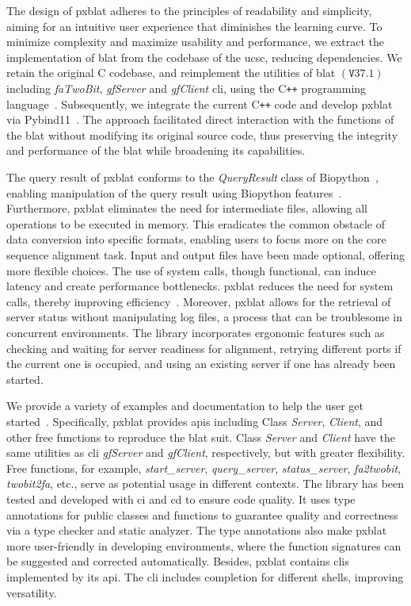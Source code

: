 The design of \gls{pxblat} adheres to the principles of readability and simplicity, aiming for an intuitive user experience that diminishes the learning curve.
To minimize complexity and maximize usability and performance, we extract the implementation of \gls{blat} from the codebase of the \gls{ucsc}, reducing dependencies.
We retain the original C codebase, and reimplement the utilities of \gls{blat} \(\left(\mathtt{V}37.1\right)\) including \emph{faTwoBit}, \emph{gfServer} and \emph{gfClient} \gls{cli}, using the C\texttt{++} programming language~\citep{kent2002blat}.
Subsequently, we integrate the current C\texttt{++} code and develop \gls{pxblat} via Pybind11~\citep{pybind11}.
The approach facilitated direct interaction with the functions of the \gls{blat} without modifying its original source code, thus preserving the integrity and performance of the \gls{blat} while broadening its capabilities.

The query result of \gls{pxblat} conforms to the \emph{QueryResult} class of Biopython~\citep{cock2009biopython}, enabling  manipulation of the query result using Biopython features~.
Furthermore, \gls{pxblat} eliminates the need for intermediate files, allowing all operations to be executed in memory.
This eradicates the common obstacle of data conversion into specific formats, enabling users to focus more on the core sequence alignment task.
Input and output files have been made optional, offering more flexible choices.
The use of system calls, though functional, can induce latency and create performance bottlenecks.
\gls{pxblat} reduces the need for system calls, thereby improving efficiency~.
Moreover, \gls{pxblat} allows for the retrieval of server status without manipulating log files, a process that can be troublesome in concurrent environments.
The library incorporates ergonomic features such as checking and waiting for server readiness for alignment, retrying different ports if the current one is occupied, and using an existing server if one has already been started.

We provide a variety of examples and documentation to help the user get started~.
Specifically, \gls{pxblat} provides \glspl{api} including Class \emph{Server}, \emph{Client}, and other free functions to reproduce the \gls{blat} suit.
Class \emph{Server} and \emph{Client} have the same utilities as \gls{cli} \emph{gfServer} and \emph{gfClient}, respectively, but with greater flexibility.
Free functions, for example, \emph{start\_server}, \emph{query\_server}, \emph{status\_server}, \emph{fa2twobit}, \emph{twobit2fa}, etc., serve as potential usage in different contexts.
The library has been tested and developed with \gls{ci} and \gls{cd} to ensure code quality.
It uses type annotations for public classes and functions to guarantee quality and correctness via a type checker and static analyzer.
The type annotations also make \gls{pxblat} more user-friendly in developing environments, where the function signatures can be suggested and corrected automatically.
Besides, \gls{pxblat} contains \glspl{cli} implemented by its \gls{api}.
The \gls{cli} includes completion for different shells, improving versatility.

